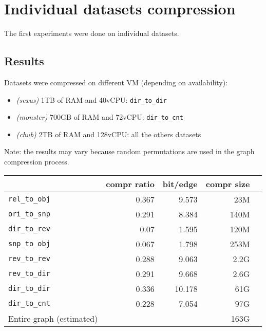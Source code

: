 \documentclass[11pt,a4paper]{article}
\begin{document}
\section{Individual datasets compression}

The first experiments were done on individual datasets.

\subsection{Results}

Datasets were compressed on different VM (depending on availability):

\begin{itemize}
    \item \textit{(sexus)} 1TB of RAM and 40vCPU: \texttt{dir_to_dir}
    \item \textit{(monster)} 700GB of RAM and 72vCPU:
        \texttt{dir_to_cnt}
    \item \textit{(chub)} 2TB of RAM and 128vCPU: all the others datasets
\end{itemize}

Note: the results may vary because random permutations are used in the graph
compression process.

\begin{center}
    \begin{tabular}{@{} l *4r @{}}
        \toprule
        \multicolumn{1}{c}{} &
            \textbf{compr ratio} & \textbf{bit/edge} & \textbf{compr
            size\footnotemark} \\
        \midrule
        \texttt{rel\_to\_obj} & 0.367 & 9.573 & 23M \\
        \texttt{ori\_to\_snp} & 0.291 & 8.384 & 140M \\
        \texttt{dir\_to\_rev} & 0.07 & 1.595 & 120M & \\
        \texttt{snp\_to\_obj} & 0.067 & 1.798 & 253M \\
        \texttt{rev\_to\_rev} & 0.288 & 9.063 & 2.2G \\
        \texttt{rev\_to\_dir} & 0.291 & 9.668 & 2.6G \\
        \texttt{dir\_to\_dir} & 0.336 & 10.178 & 61G \\
        \texttt{dir\_to\_cnt} & 0.228 & 7.054 & 97G \\
        \midrule
        Entire graph (estimated) & & & 163G \\
        \bottomrule
    \end{tabular}
\end{center}
\end{document}

